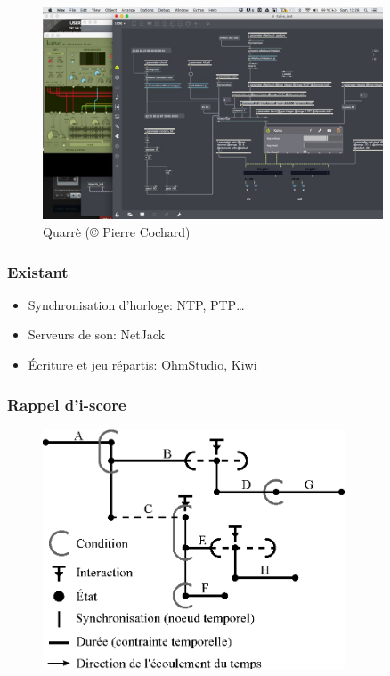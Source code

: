 \documentclass[]{beamer}
\begin{document}
\begin{frame}
\Large
\begin{figure}
	\centering
	\includegraphics[width=0.9\textwidth]{images/quarre-3.jpg}
	\caption{Quarrè (© Pierre Cochard)}
\end{figure}
\end{frame}


\begin{frame}
    \frametitle{Existant}
    \Large
    \begin{itemize}
        \item Synchronisation d'horloge: NTP, PTP\dots
        \item Serveurs de son: NetJack
        \item Écriture et jeu répartis: OhmStudio, Kiwi
    \end{itemize}
\end{frame}

\begin{frame}
\frametitle{Rappel d'i-score}
\begin{figure}
    \includegraphics[width=0.8\textwidth]{scenarios/iscore-example.eps}
\end{figure}
\end{frame}
\end{document}
